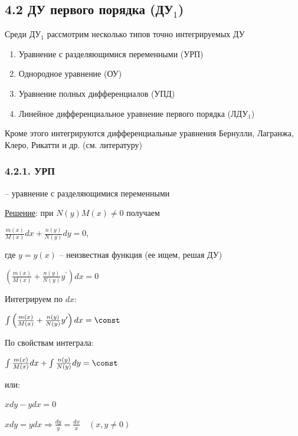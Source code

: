 \documentclass[12pt]{article}
\begin{document}
    \subsection{4.2 ДУ первого порядка (ДУ$_1$)}

    \Nota Среди ДУ$_1$ рассмотрим несколько типов точно интегрируемых ДУ

    \begin{enumerate}
        \item Уравнение с разделяющимися переменными (УРП)

        \item Однородное уравнение (ОУ)

        \item Уравнение полных дифференциалов (УПД)

        \item Линейное дифференциальное уравнение первого порядка (ЛДУ$_1$)
    \end{enumerate}
    Кроме этого интегрируются дифференциальные уравнения Бернулли, Лагранжа, Клеро, Рикатти и др. (см. литературу)

    \hypertarget{equationwithseparablevariables}{}

    \subsubsection{4.2.1. УРП}

    \Def {} -- уравнение с разделяющимися переменными

    \underline{Решение}: при $N(y)M(x) \neq 0$ получаем

    $\frac{m(x)}{M(x)}dx + \frac{n(y)}{N(y)}dy = 0$,
    
    где $y = y(x)$ -- неизвестная функция (ее ищем, решая ДУ)

    $\left(\frac{m(x)}{M(x)} + \frac{n(y)}{N(y)}y^\prime\right)dx = 0$

    Интегрируем по $dx$:

    $\int \left(\frac{m(x)}{M(x)} + \frac{n(y)}{N(y)}y^\prime\right)dx = \const$

    По свойствам интеграла:

    $\int \frac{m(x)}{M(x)}dx + \int\frac{n(y)}{N(y)}dy = \const$

    или: 

    \Ex $xdy - ydx = 0$

    $xdy = ydx \Longrightarrow \frac{dy}{y} = \frac{dx}{x} \quad (x, y \neq 0)$
\end{document}
